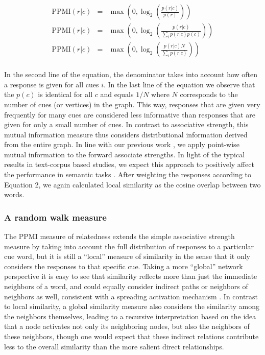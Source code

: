 \documentclass[a4paper,doc,natbib,floatsintext]{apa6}
\begin{document}
\begin{equation}
\begin{array}{lcl}

\mbox{PPMI}(r|c)& = & \max\left(0, \log_2 \left(\frac{p(r|c)}{ p(r)} \right)\right) \\[10pt]
\mbox{PPMI}(r|c) & = & \max\left(0, \log_2 \left(\frac{p(r|c)}{ \sum_i p(r|c) p(c)} \right)\right) \\[10pt]
\mbox{PPMI}(r|c) & = & \max\left(0, \log_2 \left(\frac{p(r|c)N}{ \sum_i p(r|c)} \right)\right) \\[10pt]
\end{array}
\end{equation}

In the second line of the equation, the denominator takes into account how often a response is given for all cues $i$. In the last line of the equation we observe that the $p(c)$ is identical for all $c$ and equals $1/N$ where $N$ corresponds to the number of cues (or vertices) in the graph.
This way, responses that are given very frequently for many cues are considered less informative than responses that are given for only a small number of cues. In contrast to associative strength, this mutual information measure thus considers distributional information derived from the entire graph. In line with our previous work \citep{DeDeyne2016JEP,DeDeyne2016ACL}, we apply point-wise mutual information to the forward associate strengths. In light of the typical results in text-corpus based studies, we expect this approach to positively affect the performance in semantic tasks \citep{Bullinaria2007}. After weighting the responses according to Equation 2, we again calculated local similarity as the cosine overlap between two words.




\subsubsection{A random walk measure}
The PPMI measure of relatedness extends the simple associative strength measure by taking into account the full distribution of responses to a particular cue word, but it is still a ``local'' measure of similarity in the sense that it only considers the responses to that specific cue.
Taking a more ``global'' network perspective it is easy to see that similarity reflects more than just the immediate neighbors of a word, and could equally consider indirect paths or neighbors of neighbors as well, consistent with a spreading activation mechanism \citep{Collins1975}. In contrast to local similarity, a global similarity measure also considers the similarity among the neighbors themselves, leading to a recursive interpretation based on the idea that a node activates not only its neighboring nodes, but also the neighbors of these neighbors, though one would expect that these indirect relations contribute less to the overall similarity than the more salient direct relationships.
\end{document}
